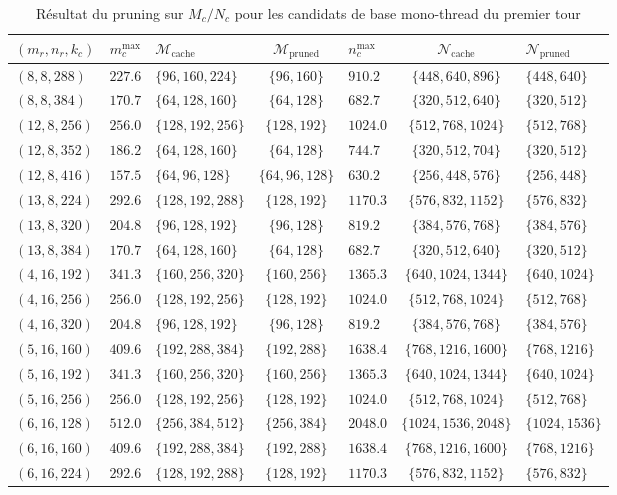 \documentclass[a4paper,11pt,oneside]{article}
\begin{document}
\begin{table}[H]
\centering
\begin{tabular}{lclclcl}
\toprule
\textbf{$(m_r,n_r,k_c)$} & $m_c^{\max}$ & \textbf{$\mathcal{M}_{\text{cache}}$} & \textbf{$\mathcal{M}_{\text{pruned}}$} & $n_c^{\max}$ & \textbf{$\mathcal{N}_{\text{cache}}$} & \textbf{$\mathcal{N}_{\text{pruned}}$} \\
\midrule
$(8,8,288)$   & $227.6$ & $\{96,160,224\}$   & $\{96,160\}$   & $910.2$  & $\{448,640,896\}$     & $\{448,640\}$ \\
$(8,8,384)$   & $170.7$ & $\{64,128,160\}$   & $\{64,128\}$   & $682.7$  & $\{320,512,640\}$     & $\{320,512\}$ \\
$(12,8,256)$  & $256.0$ & $\{128,192,256\}$  & $\{128,192\}$  & $1024.0$ & $\{512,768,1024\}$    & $\{512,768\}$ \\
$(12,8,352)$  & $186.2$ & $\{64,128,160\}$   & $\{64,128\}$   & $744.7$  & $\{320,512,704\}$     & $\{320,512\}$ \\
$(12,8,416)$  & $157.5$ & $\{64,96,128\}$    & $\{64,96,128\}$ & $630.2$ & $\{256,448,576\}$     & $\{256,448\}$ \\
$(13,8,224)$  & $292.6$ & $\{128,192,288\}$  & $\{128,192\}$  & $1170.3$ & $\{576,832,1152\}$    & $\{576,832\}$ \\
$(13,8,320)$  & $204.8$ & $\{96,128,192\}$   & $\{96,128\}$   & $819.2$  & $\{384,576,768\}$     & $\{384,576\}$ \\
$(13,8,384)$  & $170.7$ & $\{64,128,160\}$   & $\{64,128\}$   & $682.7$  & $\{320,512,640\}$     & $\{320,512\}$ \\
$(4,16,192)$  & $341.3$ & $\{160,256,320\}$  & $\{160,256\}$  & $1365.3$ & $\{640,1024,1344\}$   & $\{640,1024\}$ \\
$(4,16,256)$  & $256.0$ & $\{128,192,256\}$  & $\{128,192\}$  & $1024.0$ & $\{512,768,1024\}$    & $\{512,768\}$ \\
$(4,16,320)$  & $204.8$ & $\{96,128,192\}$   & $\{96,128\}$   & $819.2$  & $\{384,576,768\}$     & $\{384,576\}$ \\
$(5,16,160)$  & $409.6$ & $\{192,288,384\}$  & $\{192,288\}$  & $1638.4$ & $\{768,1216,1600\}$   & $\{768,1216\}$ \\
$(5,16,192)$  & $341.3$ & $\{160,256,320\}$  & $\{160,256\}$  & $1365.3$ & $\{640,1024,1344\}$   & $\{640,1024\}$ \\
$(5,16,256)$  & $256.0$ & $\{128,192,256\}$  & $\{128,192\}$  & $1024.0$ & $\{512,768,1024\}$    & $\{512,768\}$ \\
$(6,16,128)$  & $512.0$ & $\{256,384,512\}$  & $\{256,384\}$  & $2048.0$ & $\{1024,1536,2048\}$  & $\{1024,1536\}$ \\
$(6,16,160)$  & $409.6$ & $\{192,288,384\}$  & $\{192,288\}$  & $1638.4$ & $\{768,1216,1600\}$   & $\{768,1216\}$ \\
$(6,16,224)$  & $292.6$ & $\{128,192,288\}$  & $\{128,192\}$  & $1170.3$ & $\{576,832,1152\}$    & $\{576,832\}$ \\
\bottomrule
\end{tabular}
\caption{Résultat du pruning sur $M_c/N_c$ pour les candidats de base mono-thread du premier tour}
\label{tab:appendix_round1_pruned}
\end{table}
\end{document}
